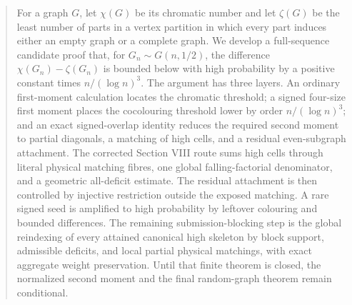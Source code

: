 %


\begin{abstract}
For a graph $G$, let $\chi(G)$ be its chromatic number and let $\zeta(G)$ be the
least number of parts in a vertex partition in which every part induces either
an empty graph or a complete graph.  We develop a full-sequence candidate proof
that, for $G_n\sim G(n,1/2)$, the difference $\chi(G_n)-\zeta(G_n)$ is bounded
below with high probability by a positive constant times
$n/(\log n)^3$.  The argument has three layers.  An ordinary first-moment
calculation locates the chromatic threshold; a signed four-size first moment
places the cocolouring threshold lower by order $n/(\log n)^3$; and an exact
signed-overlap identity reduces the required second moment to partial
diagonals, a matching of high cells, and a residual even-subgraph attachment.
The corrected Section VIII route sums high cells through literal physical
matching fibres, one global falling-factorial denominator, and a geometric
all-deficit estimate.  The residual attachment is then controlled by injective
restriction outside the exposed matching.  A rare signed seed is amplified to
high probability by leftover colouring and bounded differences.  The remaining
submission-blocking step is the global reindexing of every attained canonical
high skeleton by block support, admissible deficits, and local partial physical
matchings, with exact aggregate weight preservation.  Until that finite theorem
is closed, the normalized second moment and the final random-graph theorem
remain conditional.
\end{abstract}


